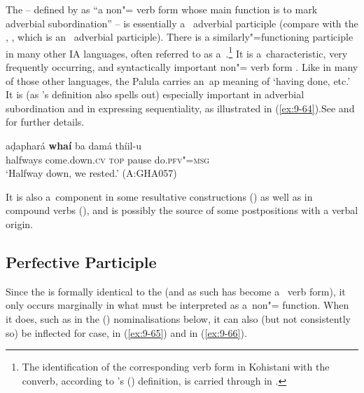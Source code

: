 The  -- defined by \citet{haspelmath1995} as ``a non"= verb form whose main function is to mark adverbial subordination'' -- is essentially a~ adverbial participle (compare with the , , which is an~ adverbial participle). There is a similarly"=functioning participle in many other IA languages, often referred to as a~.\footnote{The identification of the corresponding verb form in Kohistani \iliShina with the converb, according to \citeauthor{haspelmath1995}'s (\citeyear{haspelmath1995}) definition, is carried through in \citealt{schmidt2003}.} It is  a~characteristic, very frequently occurring, and syntactically important non"= verb form \citep[323, 397--401]{masica1991}. Like in many of those other languages, the Palula  carries an~ap meaning of `having done, etc.' It is (as \citeauthor{haspelmath1995}'s definition also spells out) especially important in adverbial subordination and in expressing  sequentiality, as illustrated in (\ref{ex:9-64}).See  and  for further details.

\begin{exe}
\ex
\label{ex:9-64}
\gll aḍaphará \textbf{whaí} ba damá thíil-u \\
halfways come.down.\textsc{cv} \textsc{top} pause do.\textsc{pfv"=msg} \\
\glt `Halfway down, we rested.' (A:GHA057)
\end{exe}

It is also a~component in some resultative constructions () as well as in compound verbs (), and is possibly the source of some postpositions with a verbal origin.


\subsection{Perfective Participle}
\label{subsec:9-3-2}


Since the  is formally identical to the  (and as such has become a~ verb form), it only occurs marginally in what must be interpreted as a~non"= function. When it does, such as in the () nominalisations below, it can also (but not consistently so) be inflected for case,  in (\ref{ex:9-65}) and  in (\ref{ex:9-66}).


